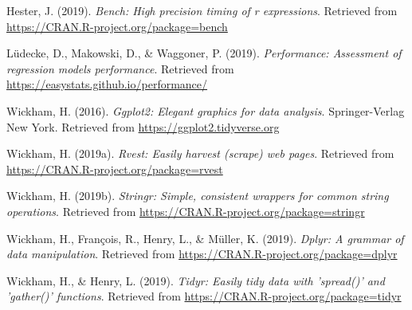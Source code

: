 \documentclass[doc]{apa6}
\begin{document}
\leavevmode\hypertarget{ref-R-bench}{}%
Hester, J. (2019). \emph{Bench: High precision timing of r expressions}. Retrieved from \url{https://CRAN.R-project.org/package=bench}

\leavevmode\hypertarget{ref-R-performance}{}%
Lüdecke, D., Makowski, D., \& Waggoner, P. (2019). \emph{Performance: Assessment of regression models performance}. Retrieved from \url{https://easystats.github.io/performance/}

\leavevmode\hypertarget{ref-R-ggplot2}{}%
Wickham, H. (2016). \emph{Ggplot2: Elegant graphics for data analysis}. Springer-Verlag New York. Retrieved from \url{https://ggplot2.tidyverse.org}

\leavevmode\hypertarget{ref-R-rvest}{}%
Wickham, H. (2019a). \emph{Rvest: Easily harvest (scrape) web pages}. Retrieved from \url{https://CRAN.R-project.org/package=rvest}

\leavevmode\hypertarget{ref-R-stringr}{}%
Wickham, H. (2019b). \emph{Stringr: Simple, consistent wrappers for common string operations}. Retrieved from \url{https://CRAN.R-project.org/package=stringr}

\leavevmode\hypertarget{ref-R-dplyr}{}%
Wickham, H., François, R., Henry, L., \& Müller, K. (2019). \emph{Dplyr: A grammar of data manipulation}. Retrieved from \url{https://CRAN.R-project.org/package=dplyr}

\leavevmode\hypertarget{ref-R-tidyr}{}%
Wickham, H., \& Henry, L. (2019). \emph{Tidyr: Easily tidy data with 'spread()' and 'gather()' functions}. Retrieved from \url{https://CRAN.R-project.org/package=tidyr}

\endgroup
\end{document}
